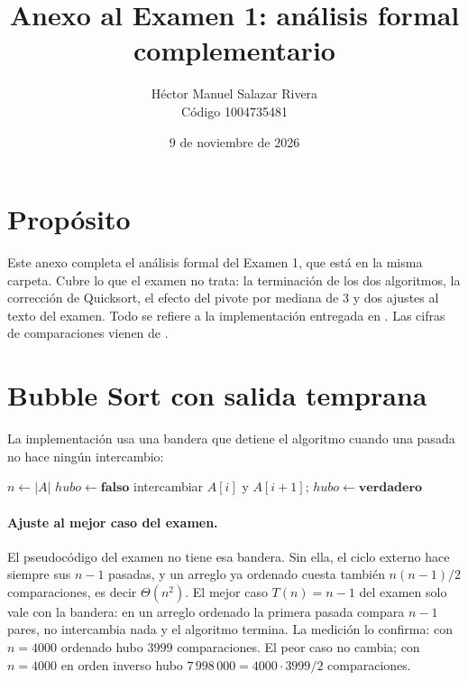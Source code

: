 \documentclass[11pt]{article}
\title{Anexo al Examen 1: análisis formal complementario}
\author{Héctor Manuel Salazar Rivera\\Código 1004735481}
\date{9 de noviembre de 2026}
\begin{document}
\maketitle

\section*{Propósito}

Este anexo completa el análisis formal del Examen 1, que está en la misma carpeta. Cubre lo que el examen no trata: la terminación de los dos algoritmos, la corrección de Quicksort, el efecto del pivote por mediana de 3 y dos ajustes al texto del examen. Todo se refiere a la implementación entregada en . Las cifras de comparaciones vienen de .

\section{Bubble Sort con salida temprana}

La implementación usa una bandera que detiene el algoritmo cuando una pasada no hace ningún intercambio:

\begin{algorithmic}[1]
  \State $n \gets |A|$
    \State $\mathit{hubo} \gets \textbf{falso}$
        \State intercambiar $A[i]$ y $A[i+1]$; $\mathit{hubo} \gets \textbf{verdadero}$
      \EndIf
    \EndFor
     \Return \EndIf
  \EndFor
\EndFunction
\end{algorithmic}

\paragraph{Ajuste al mejor caso del examen.} El pseudocódigo del examen no tiene esa bandera. Sin ella, el ciclo externo hace siempre sus $n-1$ pasadas, y un arreglo ya ordenado cuesta también $n(n-1)/2$ comparaciones, es decir $\Theta(n^2)$. El mejor caso $T(n) = n-1$ del examen solo vale con la bandera: en un arreglo ordenado la primera pasada compara $n-1$ pares, no intercambia nada y el algoritmo termina. La medición lo confirma: con $n = 4000$ ordenado hubo $3999$ comparaciones. El peor caso no cambia; con $n = 4000$ en orden inverso hubo $7\,998\,000 = 4000 \cdot 3999 / 2$ comparaciones.
\end{document}
